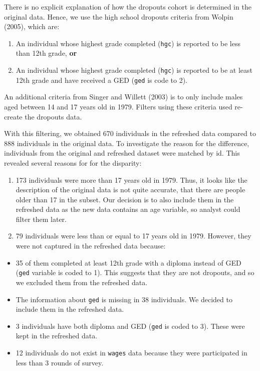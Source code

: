 \documentclass{article}
\begin{document}
There is no explicit explanation of how the dropouts cohort is determined in the original data. Hence, we use the high school dropouts criteria from Wolpin (2005), which are:

\begin{enumerate}
\def\labelenumi{\arabic{enumi}.}
\tightlist
\item
  An individual whose highest grade completed (\texttt{hgc}) is reported to be less than 12th grade, \textbf{or}
\item
  An individual whose highest grade completed (\texttt{hgc}) is reported to be at least 12th grade and have received a GED (\texttt{ged} is code to 2).
\end{enumerate}

An additional criteria from Singer and Willett (2003) is to only include males aged between 14 and 17 years old in 1979. Filters using these criteria used re-create the dropouts data.

With this filtering, we obtained 670 individuals in the refreshed data compared to 888 individuals in the original data. To investigate the reason for the difference, individuals from the original and refreshed dataset were matched by id. This revealed several reasons for for the disparity:

\begin{enumerate}
\def\labelenumi{\arabic{enumi}.}
\tightlist
\item
  173 individuals were more than 17 years old in 1979. Thus, it looks like the description of the original data is not quite accurate, that there are people older than 17 in the subset. Our decision is to also include them in the refreshed data as the new data contains an age variable, so analyst could filter them later.
\item
  79 individuals were less than or equal to 17 years old in 1979. However, they were not captured in the refreshed data because:
\end{enumerate}

\begin{itemize}
\tightlist
\item
  35 of them completed at least 12th grade with a diploma instead of GED (\texttt{ged} variable is coded to 1). This suggests that they are not dropouts, and so we excluded them from the refreshed data.
\item
  The information about \texttt{ged} is missing in 38 individuals. We decided to include them in the refreshed data.
\item
  3 individuals have both diploma and GED (\texttt{ged} is coded to 3). These were kept in the refreshed data.
\item
  12 individuals do not exist in \texttt{wages} data because they were participated in less than 3 rounds of survey.
\end{itemize}
\end{document}
